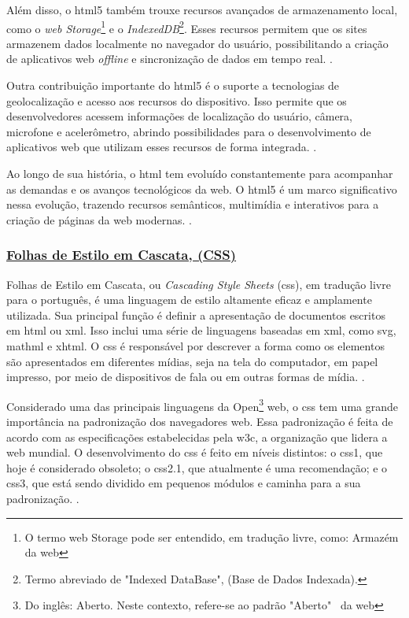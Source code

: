 Além disso, o
\acrshort{html}5
também trouxe recursos avançados de armazenamento local,
como o
\textit{\acrshort{web} Storage}\footnote{O termo
    \acrshort{web} Storage pode ser entendido, em tradução
    livre, como: Armazém da \acrshort{web}
}
e o
\textit{IndexedDB}\footnote{Termo abreviado de "Indexed DataBase", (Base de Dados Indexada).
}.
Esses recursos permitem que os sites armazenem dados
localmente no navegador do usuário, possibilitando a criação de aplicativos web
\textit{offline}
e
sincronização de dados em tempo real.
\cite{w3c}.

Outra contribuição importante do
\acrshort{html}5
é o suporte a tecnologias de
geolocalização e acesso aos recursos do dispositivo. Isso permite que os desenvolvedores
acessem informações de localização do usuário, câmera, microfone e acelerômetro, abrindo
possibilidades para o desenvolvimento de aplicativos web que utilizam esses recursos de
forma integrada.
\cite{w3c}.

Ao longo de sua história, o
\acrshort{html}
tem evoluído constantemente para acompanhar as
demandas e os avanços tecnológicos da web. O
\acrshort{html}5
é um marco significativo nessa
evolução, trazendo recursos semânticos, multimídia e interativos para a criação de páginas da
web modernas.
\cite{w3c}.

\subsubsection{\underline{Folhas de Estilo em Cascata, (CSS)}}

Folhas de Estilo em Cascata, ou \textit{Cascading Style Sheets}
(\acrshort{css}),
em tradução livre
para o português, é uma linguagem de estilo altamente eficaz e amplamente utilizada. Sua
principal função é definir a apresentação de documentos escritos em
\acrshort{html}
ou
\acrshort{xml}.
Isso
inclui uma série de linguagens baseadas em
\acrshort{xml},
como
\acrshort{svg},
\acrshort{mathml}
e
\acrshort{xhtml}.
O
\acrshort{css}
é
responsável por descrever a forma como os elementos são apresentados em diferentes mídias,
seja na tela do computador, em papel impresso, por meio de dispositivos de fala ou em outras
formas de mídia.
\cite{mdn-css}.

Considerado uma das principais linguagens da
Open\footnote{Do inglês: Aberto. Neste contexto, refere-se ao padrão "Aberto"~ da
    \acrshort{web}
}
\acrshort{web},
o
\acrshort{css}
tem uma grande
importância na padronização dos navegadores
\acrshort{web}.
Essa padronização é feita de acordo com
as especificações estabelecidas pela
\acrshort{w3c},
a organização que lidera a
\acrshort{web}
mundial. O
desenvolvimento do
\acrshort{css}
é feito em níveis distintos: o
\acrshort{css}1,
que hoje é considerado
obsoleto; o
\acrshort{css}2.1,
que atualmente é uma recomendação; e o
\acrshort{css}3,
que está sendo dividido
em pequenos módulos e caminha para a sua padronização.
\cite{mdn-css}.

